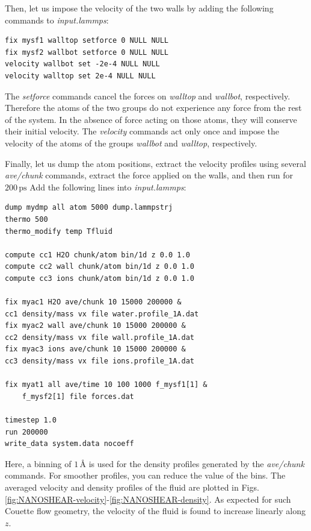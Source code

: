 \documentclass[9pt,tutorial]{livecoms}
\begin{document}
Then, let us impose the velocity of the two walls by adding the following commands to \textit{input.lammps}:
{\normalsize \begin{verbatim}
fix mysf1 walltop setforce 0 NULL NULL
fix mysf2 wallbot setforce 0 NULL NULL
velocity wallbot set -2e-4 NULL NULL
velocity walltop set 2e-4 NULL NULL
\end{verbatim}}
The \textit{setforce} commands cancel the forces on \textit{walltop} and \textit{wallbot}, respectively. Therefore the atoms of the two groups do not experience any force from the rest of the system. In the absence of force acting on those atoms, they will conserve their initial velocity. The \textit{velocity} commands act only once and impose the velocity of the atoms of the groups \textit{wallbot} and \textit{walltop}, respectively.

Finally, let us dump the atom positions, extract the velocity profiles using several \textit{ave/chunk} commands, extract the
force applied on the walls, and then run for $200\,\text{ps}$ Add the following lines into \textit{input.lammps}:
{\normalsize \begin{verbatim}
dump mydmp all atom 5000 dump.lammpstrj
thermo 500
thermo_modify temp Tfluid

compute cc1 H2O chunk/atom bin/1d z 0.0 1.0
compute cc2 wall chunk/atom bin/1d z 0.0 1.0
compute cc3 ions chunk/atom bin/1d z 0.0 1.0

fix myac1 H2O ave/chunk 10 15000 200000 &
cc1 density/mass vx file water.profile_1A.dat
fix myac2 wall ave/chunk 10 15000 200000 &
cc2 density/mass vx file wall.profile_1A.dat
fix myac3 ions ave/chunk 10 15000 200000 &
cc3 density/mass vx file ions.profile_1A.dat

fix myat1 all ave/time 10 100 1000 f_mysf1[1] &
    f_mysf2[1] file forces.dat

timestep 1.0
run 200000
write_data system.data nocoeff
\end{verbatim}}
Here, a binning of $1\,\text{\AA{}}$ is used for the density profiles generated by the \textit{ave/chunk} commands. For smoother profiles, you can reduce the value of the bins. The averaged velocity and density profiles of the fluid are plotted in Figs.\ref{fig:NANOSHEAR-velocity}-\ref{fig:NANOSHEAR-density}. As expected for such Couette flow geometry, the velocity of the fluid is found to increase linearly along $z$.
\end{document}
